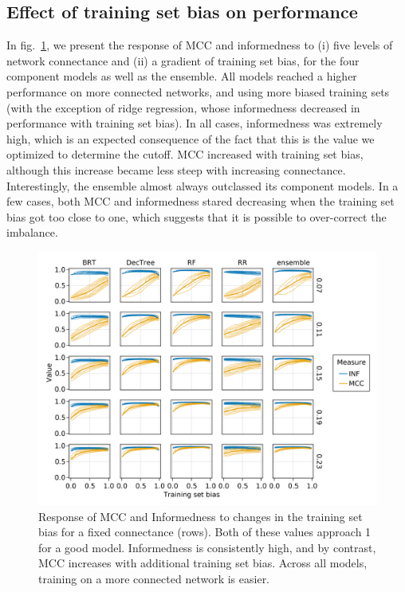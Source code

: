 \documentclass[10pt,oneside]{article}
\makeatletter
\def\maxwidth{\ifdim\Gin@nat@width>\linewidth\linewidth
\else\Gin@nat@width\fi}
\let\Oldincludegraphics\includegraphics
\renewcommand{\includegraphics}[1]{\Oldincludegraphics[width=\maxwidth]{#1}}
\makeatother
\begin{document}
\hypertarget{effect-of-training-set-bias-on-performance}{%
\subsection{Effect of training set bias on
performance}\label{effect-of-training-set-bias-on-performance}}

In fig.~\ref{fig:biasmccinf}, we present the response of MCC and
informedness to (i) five levels of network connectance and (ii) a
gradient of training set bias, for the four component models as well as
the ensemble. All models reached a higher performance on more connected
networks, and using more biased training sets (with the exception of
ridge regression, whose informedness decreased in performance with
training set bias). In all cases, informedness was extremely high, which
is an expected consequence of the fact that this is the value we
optimized to determine the cutoff. MCC increased with training set bias,
although this increase became less steep with increasing connectance.
Interestingly, the ensemble almost always outclassed its component
models. In a few cases, both MCC and informedness stared decreasing when
the training set bias got too close to one, which suggests that it is
possible to over-correct the imbalance.

\begin{figure}
\hypertarget{fig:biasmccinf}{%
\centering
\includegraphics{figures/bias_mcc_inf.png}
\caption{Response of MCC and Informedness to changes in the training set
bias for a fixed connectance (rows). Both of these values approach 1 for
a good model. Informedness is consistently high, and by contrast, MCC
increases with additional training set bias. Across all models, training
on a more connected network is easier.}\label{fig:biasmccinf}
}
\end{figure}
\end{document}
